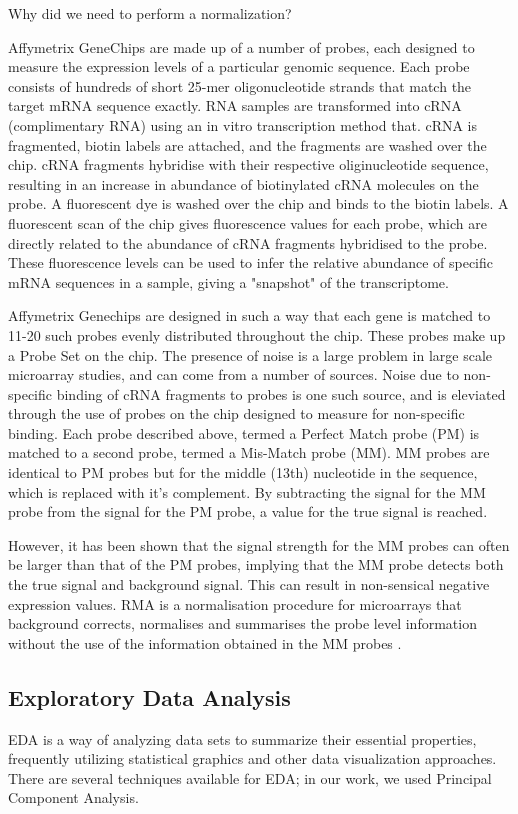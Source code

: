 \documentclass[journal]{IEEEtran}
\begin{document}
Why did we need to perform a normalization?

Affymetrix GeneChips are made up of a number of probes, each designed to measure the expression levels of a particular genomic sequence. Each probe consists of hundreds of short 25-mer oligonucleotide strands that match the target mRNA sequence exactly. RNA samples are transformed into cRNA (complimentary RNA) using an in vitro transcription method that. cRNA is fragmented, biotin labels are attached, and the fragments are washed over the chip. cRNA fragments hybridise with their respective oliginucleotide sequence, resulting in an increase in abundance of biotinylated cRNA molecules on the probe. A fluorescent dye is washed over the chip and binds to the biotin labels. A fluorescent scan of the chip gives fluorescence values for each probe, which are directly related to the abundance of cRNA fragments hybridised to the probe. These fluorescence levels can be used to infer the relative abundance of specific mRNA sequences in a sample, giving a "snapshot" of the transcriptome.

Affymetrix Genechips are designed in such a way that each gene is matched to 11-20 such probes evenly distributed throughout the chip. These probes make up a Probe Set on the chip. The presence of noise is a large problem in large scale microarray studies, and can come from a number of sources. Noise due to non-specific binding of cRNA fragments to probes is one such source, and is eleviated through the use of probes on the chip designed to measure for non-specific binding. Each probe described above, termed a Perfect Match probe (PM) is matched to a second probe, termed a Mis-Match probe (MM). MM probes are identical to PM probes but for the middle (13th) nucleotide in the sequence, which is replaced with it's complement. By subtracting the signal for the MM probe from the signal for the PM probe, a value for the true signal is reached.

However, it has been shown that the signal strength for the MM probes can often be larger than that of the PM probes, implying that the MM probe detects both the true signal and background signal. This can result in non-sensical negative expression values. RMA is a normalisation procedure for microarrays that background corrects, normalises and summarises the probe level information without the use of the information obtained in the MM probes \cite{Irizarry2003, Irizarry2003b, Bolstad2003}.

\subsection{Exploratory Data Analysis}
EDA is a way of analyzing data sets to summarize their essential properties, frequently utilizing statistical graphics and other data visualization approaches. There are several techniques available for EDA; in our work, we used Principal Component Analysis.
\end{document}
